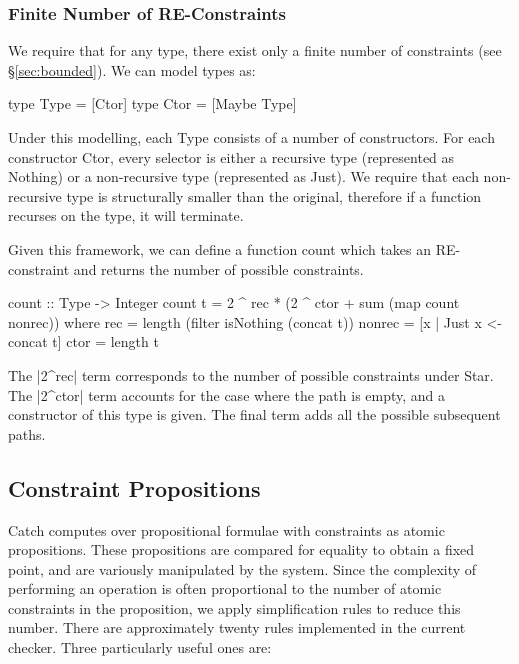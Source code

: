\documentclass[preprint]{sigplanconf}
\newcommand{\C}[1]{\textsf{#1}}
\begin{document}
\subsubsection{Finite Number of RE-Constraints}
\label{sec:finite_re}

We require that for any type, there exist only a finite number of constraints (see \S\ref{sec:bounded}). We can model types as:

\begin{code}
type Type = [Ctor]
type Ctor = [Maybe Type]
\end{code}

Under this modelling, each \C{Type} consists of a number of constructors. For each constructor \C{Ctor}, every selector is either a recursive type (represented as \C{Nothing}) or a non-recursive type (represented as \C{Just}). We require that each non-recursive type is structurally smaller than the original, therefore if a function recurses on the type, it will terminate.

Given this framework, we can define a function \C{count} which takes an RE-constraint and returns the number of possible constraints.

\begin{code}
count :: Type -> Integer
count t = 2 ^ rec * (2 ^ ctor + sum (map count nonrec))
    where
    rec = length (filter isNothing (concat t))
    nonrec = [x | Just x <- concat t]
    ctor = length t
\end{code}

The |2^rec| term corresponds to the number of possible constraints under \C{Star}. The |2^ctor| term accounts for the case where the path is empty, and a constructor of this type is given. The final term adds all the possible subsequent paths.


\subsection{Constraint Propositions}

Catch computes over propositional formulae with constraints as atomic propositions. These propositions are compared for equality to obtain a fixed point, and are variously manipulated by the system. Since the complexity of performing an operation is often proportional to the number of atomic constraints in the proposition, we apply simplification rules to reduce this number. There are approximately twenty rules implemented in the current checker. Three particularly useful ones are:
\end{document}
